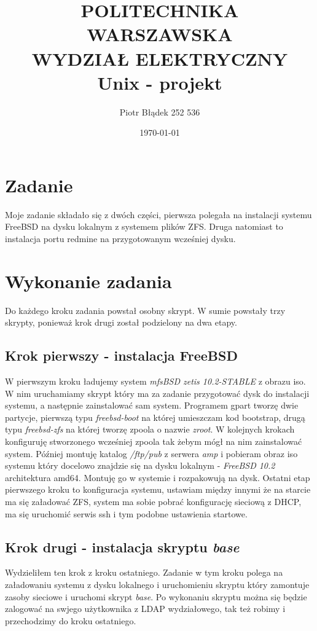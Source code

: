 \documentclass[a4paper,11pt,notitlepage]{article}
\title{POLITECHNIKA WARSZAWSKA \\ WYDZIAŁ ELEKTRYCZNY \\ Unix - projekt}
\date{\today}
\author{Piotr Błądek 252 536}
\begin{document}
\maketitle

\section{Zadanie}
Moje zadanie składało się z dwóch części, pierwsza polegała na instalacji systemu FreeBSD na dysku lokalnym z systemem plików ZFS. Druga natomiast to instalacja portu redmine na przygotowanym wcześniej dysku. 
\section{Wykonanie zadania}
Do każdego kroku zadania powstał osobny skrypt. W sumie powstały trzy skrypty, ponieważ krok drugi został podzielony na dwa etapy.
\subsection{Krok pierwszy - instalacja FreeBSD}

W pierwszym kroku ładujemy system \textit{mfsBSD zetis 10.2-STABLE} z obrazu iso. W nim uruchamiamy skrypt który ma za zadanie przygotować dysk do instalacji systemu, a następnie zainstalować sam system. Programem gpart tworzę dwie partycje, pierwszą typu \textit{freebsd-boot} na której umieszczam kod bootstrap, drugą typu \textit{freebsd-zfs} na której tworzę zpoola o nazwie \textit{zroot}. \newline
\indent
W kolejnych krokach konfiguruję stworzonego wcześniej zpoola tak żebym mógł na nim zainstalować system. Później montuję katalog \textit{/ftp/pub} z serwera \textit{amp} i pobieram obraz iso systemu który docelowo znajdzie się na dysku lokalnym - \textit{FreeBSD 10.2} architektura amd64. Montuję go w systemie i rozpakowują na dysk. \newline
\indent
Ostatni etap pierwszego kroku to konfiguracja systemu, ustawiam między innymi że na starcie ma się załadować ZFS, system ma sobie pobrać konfigurację sieciową z DHCP, ma się uruchomić serwis ssh i tym podobne ustawienia startowe.

\subsection{Krok drugi - instalacja skryptu \textit{base}}

Wydzieliłem ten krok z kroku ostatniego. Zadanie w tym kroku polega na załadowaniu systemu z dysku lokalnego i uruchomieniu skryptu który zamontuje zasoby sieciowe i uruchomi skrypt \textit{base}. Po wykonaniu skryptu można się będzie zalogować na swjego użytkownika z LDAP wydziałowego, tak też robimy i przechodzimy do kroku ostatniego.
\end{document}
